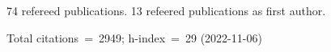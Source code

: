 74 refereed publications. 13 refeered publications as first author.

Total citations~=~2949; h-index~=~29 (2022-11-06)